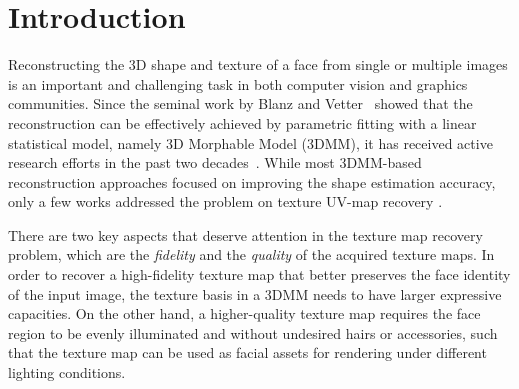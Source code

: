 \documentclass[10pt,twocolumn,letterpaper]{article}
\begin{document}
\vspace{-4mm}
\section{Introduction}
\vspace{-1mm}
\label{sec:intro}

Reconstructing the 3D shape and texture of a face from single or multiple images is an important and challenging task in both computer vision and graphics communities.
Since the seminal work by Blanz and Vetter~\cite{blanz1999morphable} showed that the reconstruction can be effectively achieved by parametric fitting with a linear statistical model, namely 3D Morphable Model (3DMM), it has received active research efforts in the past two decades~\cite{egger20203d}.
While most 3DMM-based reconstruction approaches focused on improving the shape estimation accuracy, only a few works addressed the problem on texture UV-map recovery \cite{saito2017photorealistic,yamaguchi2018high,gecer2019ganfit,lattas2020avatarme,bao2021high,luo2021normalized,lee2020uncertainty}. 


There are two key aspects that deserve attention in the texture map recovery problem, which are the \textit{fidelity} and the \textit{quality} of the acquired texture maps. 
In order to recover a high-fidelity texture map that better preserves the face identity of the input image, the texture basis in a 3DMM needs to have larger expressive capacities.
On the other hand, a higher-quality texture map requires the face region to be evenly illuminated and without undesired hairs or accessories, such that the texture map can be used as facial assets for rendering under different lighting conditions. 
\end{document}

